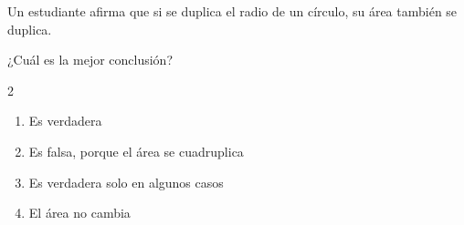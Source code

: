 Un estudiante afirma que si se duplica el radio de un círculo, su área también se duplica.

¿Cuál es la mejor conclusión?

\begin{multicols}{2}
\begin{enumerate}[label=\alph*), leftmargin=*]
\item Es verdadera
\item Es falsa, porque el área se cuadruplica
\item Es verdadera solo en algunos casos
\item El área no cambia
\end{enumerate}
\end{multicols}
